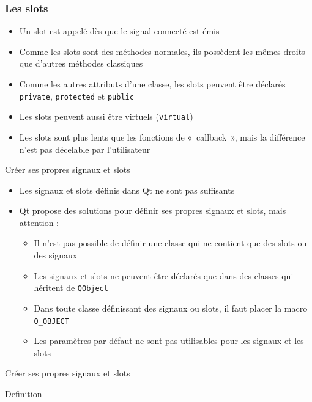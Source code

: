 \documentclass{beamer} %
\begin{document}
\begin{frame}
	\frametitle{Les slots}
	
	\begin{itemize}
	\item Un slot est appelé dès que le signal connecté est émis
	\item<2-> Comme les slots sont des méthodes normales, ils possèdent les mêmes droits que d'autres méthodes classiques
	\item<3-> Comme les autres attributs d'une classe, les slots peuvent être déclarés \texttt{private}, \texttt{protected} et \texttt{public}
	\item<4-> Les slots peuvent aussi être virtuels (\texttt{virtual})
	\item<5-> Les slots sont plus lents que les fonctions de «~callback~», mais la différence n'est pas décelable par l'utilisateur
	\end{itemize}
\end{frame}

\begin{frame}{Créer ses propres signaux et slots}
	
	\begin{itemize}
	\item Les signaux et slots définis dans Qt ne sont pas suffisants
	\item<2-> Qt propose des solutions pour définir ses propres signaux et slots, mais attention :
		\begin{itemize}
		\item<3-> Il n'est pas possible de définir une classe qui ne contient que des slots ou des signaux
		\item<4-> Les signaux et slots ne peuvent être déclarés que dans des classes qui héritent de \texttt{QObject}
		\item<5-> Dans toute classe définissant des signaux ou slots, il faut placer la macro \texttt{Q\_OBJECT}
		\item<6-> Les paramètres par défaut ne sont pas utilisables pour les signaux et les slots
		\end{itemize}
	\end{itemize}
\end{frame}
	
\begin{frame}{Créer ses propres signaux et slots}
	
	\begin{block}{Definition}
		
	\end{block}
\end{frame}
\end{document}
